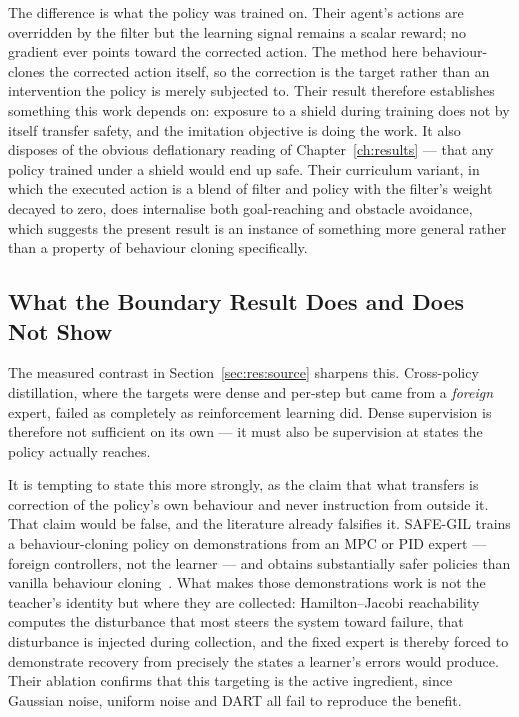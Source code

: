\documentclass[a4paper,11pt]{report}
\begin{document}
The difference is what the policy was trained on. Their agent's actions are overridden by the
filter but the learning signal remains a scalar reward; no gradient ever points toward the
corrected action. The method here behaviour-clones the corrected action itself, so the correction
is the target rather than an intervention the policy is merely subjected to. Their result therefore
establishes something this work depends on: exposure to a shield during training does not by itself
transfer safety, and the imitation objective is doing the work. It also disposes of the obvious
deflationary reading of Chapter~\ref{ch:results} --- that any policy trained under a shield would
end up safe. Their curriculum variant, in which the executed action is a blend of filter and policy
with the filter's weight decayed to zero, does internalise both goal-reaching and obstacle
avoidance, which suggests the present result is an instance of something more general rather than a
property of behaviour cloning specifically.

\subsection*{What the Boundary Result Does and Does Not Show}

The measured contrast in Section~\ref{sec:res:source} sharpens this. Cross-policy distillation,
where the targets were dense and per-step but came from a \emph{foreign} expert, failed as
completely as reinforcement learning did. Dense supervision is therefore not sufficient on its own
--- it must also be supervision at states the policy actually reaches.

It is tempting to state this more strongly, as the claim that what transfers is correction of the
policy's own behaviour and never instruction from outside it. That claim would be false, and the
literature already falsifies it. SAFE-GIL trains a behaviour-cloning policy on demonstrations from
an MPC or PID expert --- foreign controllers, not the learner --- and obtains substantially safer
policies than vanilla behaviour cloning~\cite{ciftci2025safegil}. What makes those demonstrations
work is not the teacher's identity but where they are collected: Hamilton--Jacobi reachability
computes the disturbance that most steers the system toward failure, that disturbance is injected
during collection, and the fixed expert is thereby forced to demonstrate recovery from precisely
the states a learner's errors would produce. Their ablation confirms that this targeting is the
active ingredient, since Gaussian noise, uniform noise and DART all fail to reproduce the benefit.
\end{document}
